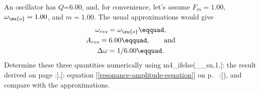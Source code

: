         An oscillator has $Q$=6.00, and, for convenience, let's assume $F_m=1.00$, $\omega_\zu{o}=1.00$,
        and $m=1.00$. The usual approximations would give
        \begin{gather*}
                \omega_{res} =\omega_\zu{o}\eqquad,\\
                A_{res}=6.00\eqquad, \qquad \text{and}\\
                \Delta\omega=1/6.00\eqquad.
        \end{gather*}
        Determine these three quantities numerically using 
        m4_ifelse(__sn,1,[:%
        the result derived on page \pageref{misc:steadystate}
        :],[:%
        equation [\ref{resonance-amplitude-equation}] on p.~\pageref{resonance-amplitude-equation}
        :]), and
        compare with the approximations.
